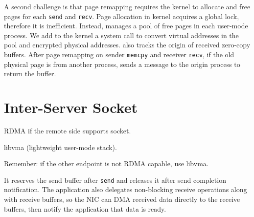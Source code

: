 A second challenge is that page remapping requires the kernel to allocate and free pages for each \texttt{send} and \texttt{recv}. Page allocation in kernel acquires a global lock, therefore it is inefficient. Instead, \libipc{} manages a pool of free pages in each user-mode process.
We add to the kernel a system call to convert virtual addresses in the pool and encrypted physical addresses.
\libipc{} also tracks the origin of received zero-copy buffers.
After page remapping on sender \texttt{memcpy} and receiver \texttt{recv}, if the old physical page is from another process, \libipc{} sends a message to the origin process to return the buffer.


\section{Inter-Server Socket}
\label{sec:rdma}

RDMA if the remote side supports socket.

 libvma (lightweight user-mode stack).

Remember: if the other endpoint is not RDMA capable, use libvma.

 It reserves the send buffer after \texttt{send} and releases it after send completion notification.
The application also delegates non-blocking receive operations along with receive buffers, so the NIC can DMA received data directly to the receive buffers, then notify the application that data is ready.